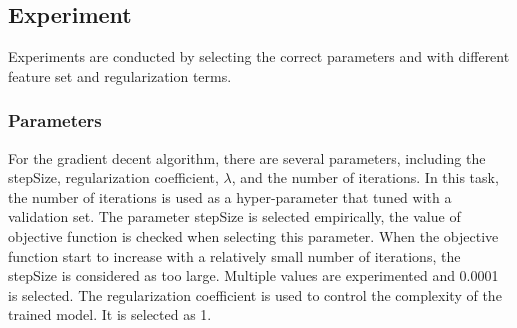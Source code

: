 \documentclass[11pt]{article}
\begin{document}
\subsection{Experiment}
Experiments are conducted by selecting the correct parameters and with different feature set and regularization terms.
\subsubsection{Parameters}
For the gradient decent algorithm, there are several parameters, including the stepSize, regularization coefficient, \(\lambda\), and the number of iterations. In this task, the number of iterations is used as a hyper-parameter that tuned with a validation set. The parameter stepSize is selected empirically, the value of objective function is checked when selecting this parameter. When the objective function start to increase with a relatively small number of iterations, the stepSize is considered as too large. Multiple values are experimented and 0.0001 is selected. The regularization coefficient is used to control the complexity of the trained model. It is selected as 1.
\end{document}

